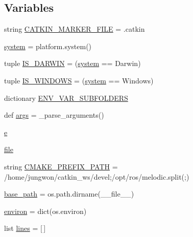 \subsection*{Variables}
\begin{DoxyCompactItemize}
\item 
string \hyperlink{namespace__setup__util_a3fa0ca5a460a71a43cbc3d4954ab1f10}{C\+A\+T\+K\+I\+N\+\_\+\+M\+A\+R\+K\+E\+R\+\_\+\+F\+I\+LE} = \textquotesingle{}.catkin\textquotesingle{}
\item 
\hyperlink{namespace__setup__util_ae9fca6a80a6923f4580be72f68fee325}{system} = platform.\+system()
\item 
tuple \hyperlink{namespace__setup__util_aecbb100ce6f94bb3c7e16d58fde05f96}{I\+S\+\_\+\+D\+A\+R\+W\+IN} = (\hyperlink{namespace__setup__util_ae9fca6a80a6923f4580be72f68fee325}{system} == \textquotesingle{}Darwin\textquotesingle{})
\item 
tuple \hyperlink{namespace__setup__util_a6fe69c2dbd92959b6651a28cbb846e6e}{I\+S\+\_\+\+W\+I\+N\+D\+O\+WS} = (\hyperlink{namespace__setup__util_ae9fca6a80a6923f4580be72f68fee325}{system} == \textquotesingle{}Windows\textquotesingle{})
\item 
dictionary \hyperlink{namespace__setup__util_aa31804f1be8660156ce9394b33c68dc4}{E\+N\+V\+\_\+\+V\+A\+R\+\_\+\+S\+U\+B\+F\+O\+L\+D\+E\+RS}
\item 
def \hyperlink{namespace__setup__util_a831491331b0650d492585147f04d6615}{args} = \+\_\+parse\+\_\+arguments()
\item 
\hyperlink{namespace__setup__util_acdce690b925de33d6249bbbfa1109d61}{e}
\item 
\hyperlink{namespace__setup__util_aea63a1b32cc79bc3d872ab7cb30dd07e}{file}
\item 
string \hyperlink{namespace__setup__util_a2a6756158bb4094ed7d259eb564d0578}{C\+M\+A\+K\+E\+\_\+\+P\+R\+E\+F\+I\+X\+\_\+\+P\+A\+TH} = \textquotesingle{}/home/jungwon/catkin\+\_\+ws/devel;/opt/ros/melodic\textquotesingle{}.split(\textquotesingle{};\textquotesingle{})
\item 
\hyperlink{namespace__setup__util_a83d25140acd7788bbcb95843fe38e639}{base\+\_\+path} = os.\+path.\+dirname(\+\_\+\+\_\+file\+\_\+\+\_\+)
\item 
\hyperlink{namespace__setup__util_a9a935bdd9ee1aa0327161025bb18c136}{environ} = dict(os.\+environ)
\item 
list \hyperlink{namespace__setup__util_a8618d8be5f729d4c9696daa5e083a001}{lines} = \mbox{[}$\,$\mbox{]}
\end{DoxyCompactItemize}



